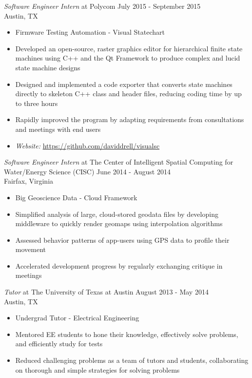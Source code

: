 \documentclass[line,margin]{res}
\begin{document}
\begin{resume}
                {\sl Software Engineer Intern} at Polycom \hfill            July 2015 - September 2015\\        
                Austin, TX 
                \begin{itemize}  \itemsep -2pt %
                  \item         Firmware Testing Automation - Visual Statechart 
                 \item Developed an open-source, raster graphics editor for hierarchical finite state machines using C++ and the Qt Framework to produce complex and lucid state machine designs
                 \item Designed and implemented a code exporter that converts state machines directly to skeleton C++ class and header files, reducing coding time by up to three hours
                 \item Rapidly improved the program by adapting requirements from consultations and meetings with end users
                 \item \textit{Website: }  \url{https://github.com/daviddrell/visualsc}
                 \end{itemize}

                 {\sl Software Engineer Intern} at The Center of Intelligent Spatial Computing for Water/Energy Science (CISC) \hfill June 2014 - August 2014\\
                 Fairfax, Virginia
                 \begin{itemize}
                 \item Big Geoscience Data - Cloud Framework
                 \item Simplified analysis of large, cloud-stored geodata files by developing middleware to quickly render geomaps using interpolation algorithms
                 \item Assessed behavior patterns of app-users using GPS data to profile their movement
                 \item Accelerated development progress by regularly exchanging critique in meetings
                 \end{itemize}

                 {\sl Tutor} at The University of Texas at Austin \hfill August 2013 - May 2014\\
                 Austin, TX
                 \begin{itemize}
                 \item Undergrad Tutor - Electrical Engineering
                 \item Mentored EE students to hone their knowledge, effectively solve problems, and efficiently study for tests
                 \item Reduced challenging problems as a team of tutors and students, collaborating on thorough and simple strategies for solving problems
                 \end{itemize}
 

\end{resume}
\end{document}
